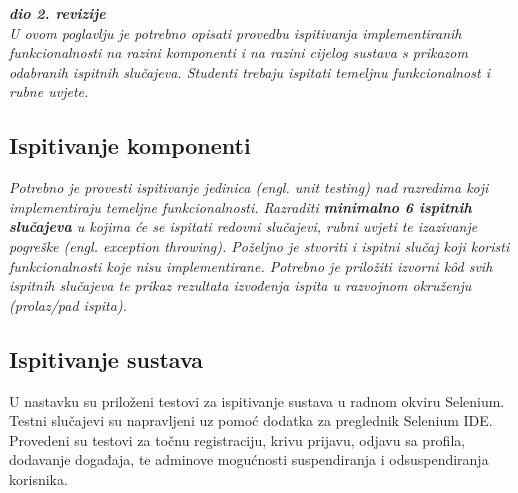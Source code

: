 			\textbf{\textit{dio 2. revizije}}\\
			
			 \textit{U ovom poglavlju je potrebno opisati provedbu ispitivanja implementiranih funkcionalnosti na razini komponenti i na razini cijelog sustava s prikazom odabranih ispitnih slučajeva. Studenti trebaju ispitati temeljnu funkcionalnost i rubne uvjete.}
	
			
			\subsection{Ispitivanje komponenti}
			\textit{Potrebno je provesti ispitivanje jedinica (engl. unit testing) nad razredima koji implementiraju temeljne funkcionalnosti. Razraditi \textbf{minimalno 6 ispitnih slučajeva} u kojima će se ispitati redovni slučajevi, rubni uvjeti te izazivanje pogreške (engl. exception throwing). Poželjno je stvoriti i ispitni slučaj koji koristi funkcionalnosti koje nisu implementirane. Potrebno je priložiti izvorni kôd svih ispitnih slučajeva te prikaz rezultata izvođenja ispita u razvojnom okruženju (prolaz/pad ispita). }
			
			
			
			
			
			\subsection{Ispitivanje sustava}
			
			 
			 
		 	
		 	\indent U nastavku su priloženi testovi za ispitivanje sustava u radnom okviru Selenium. Testni slučajevi su napravljeni uz pomoć dodatka za preglednik Selenium IDE. Provedeni su testovi za točnu registraciju, krivu prijavu, odjavu sa profila, dodavanje događaja, te adminove mogućnosti suspendiranja i odsuspendiranja korisnika.
		 	
